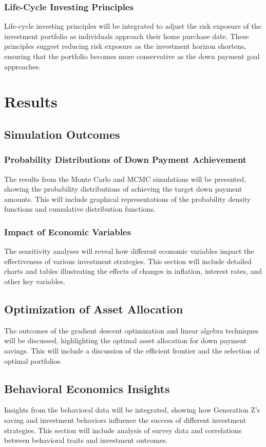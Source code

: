 \documentclass[12pt]{report}
\begin{document}
\subsection{Life-Cycle Investing Principles}
Life-cycle investing principles will be integrated to adjust the risk exposure of the investment portfolio as individuals approach their home purchase date. These principles suggest reducing risk exposure as the investment horizon shortens, ensuring that the portfolio becomes more conservative as the down payment goal approaches.

\chapter{Results}
\section{Simulation Outcomes}
\subsection{Probability Distributions of Down Payment Achievement}
The results from the Monte Carlo and MCMC simulations will be presented, showing the probability distributions of achieving the target down payment amounts. This will include graphical representations of the probability density functions and cumulative distribution functions.

\subsection{Impact of Economic Variables}
The sensitivity analyses will reveal how different economic variables impact the effectiveness of various investment strategies. This section will include detailed charts and tables illustrating the effects of changes in inflation, interest rates, and other key variables.

\section{Optimization of Asset Allocation}
The outcomes of the gradient descent optimization and linear algebra techniques will be discussed, highlighting the optimal asset allocation for down payment savings. This will include a discussion of the efficient frontier and the selection of optimal portfolios.

\section{Behavioral Economics Insights}
Insights from the behavioral data will be integrated, showing how Generation Z’s saving and investment behaviors influence the success of different investment strategies. This section will include analysis of survey data and correlations between behavioral traits and investment outcomes.
\end{document}
